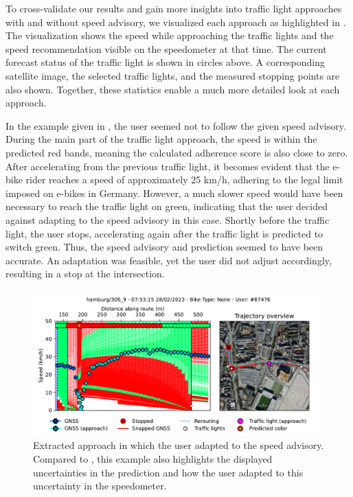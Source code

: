 To cross-validate our results and gain more insights into traffic light approaches with and without speed advisory, we visualized each approach as highlighted in . The visualization shows the speed while approaching the traffic lights and the speed recommendation visible on the speedometer at that time. The current forecast status of the traffic light is shown in circles above. A corresponding satellite image, the selected traffic lights, and the measured stopping points are also shown. Together, these statistics enable a much more detailed look at each approach.

In the example given in , the user seemed not to follow the given speed advisory. During the main part of the traffic light approach, the speed is within the predicted red bands, meaning the calculated adherence score is also close to zero. After accelerating from the previous traffic light, it becomes evident that the e-bike rider reaches a speed of approximately 25 km/h, adhering to the legal limit imposed on e-bikes in Germany. However, a much slower speed would have been necessary to reach the traffic light on green, indicating that the user decided against adapting to the speed advisory in this case. Shortly before the traffic light, the user stops, accelerating again after the traffic light is predicted to switch green. Thus, the speed advisory and prediction seemed to have been accurate. An adaptation was feasible, yet the user did not adjust accordingly, resulting in a stop at the intersection.

\begin{figure}[t]
\caption{Extracted approach in which the user adapted to the speed advisory. Compared to , this example also highlights the displayed uncertainties in the prediction and how the user adapted to this uncertainty in the speedometer.}\label{fig:example-trajectory-adapted}
\includegraphics[width=\linewidth]{images/example-trajectory-adapted.pdf}
\end{figure}

